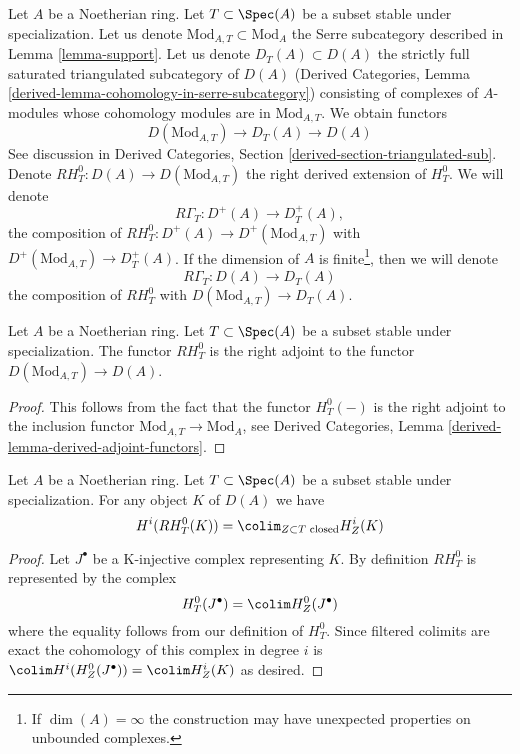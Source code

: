 \noindent
Let $A$ be a Noetherian ring. Let $T \subset \Spec(A)$ be a subset stable
under specialization. Let us denote $\text{Mod}_{A, T} \subset \text{Mod}_A$
the Serre subcategory described in Lemma \ref{lemma-support}.
Let us denote $D_T(A) \subset D(A)$ the
strictly full saturated triangulated subcategory of $D(A)$
(Derived Categories, Lemma \ref{derived-lemma-cohomology-in-serre-subcategory})
consisting of complexes of $A$-modules whose cohomology modules
are in $\text{Mod}_{A, T}$. We obtain functors
$$
D(\text{Mod}_{A, T}) \to D_T(A) \to D(A)
$$
See discussion in
Derived Categories, Section \ref{derived-section-triangulated-sub}.
Denote $RH^0_T : D(A) \to D(\text{Mod}_{A, T})$ the right
derived extension of $H^0_T$. We will denote
$$
R\Gamma_T : D^+(A) \to D^+_T(A),
$$
the composition of $RH^0_T : D^+(A) \to D^+(\text{Mod}_{A, T})$ with
$D^+(\text{Mod}_{A, T}) \to D^+_T(A)$. If the dimension of $A$ is
finite\footnote{If $\dim(A) = \infty$ the construction
may have unexpected properties on unbounded complexes.},
then we will denote
$$
R\Gamma_T : D(A) \to D_T(A)
$$
the composition of $RH^0_T$ with
$D(\text{Mod}_{A, T}) \to D_T(A)$.

\begin{lemma}
\label{lemma-adjoint}
Let $A$ be a Noetherian ring. Let $T \subset \Spec(A)$
be a subset stable under specialization. The functor
$RH^0_T$ is the right adjoint to the functor
$D(\text{Mod}_{A, T}) \to D(A)$.
\end{lemma}

\begin{proof}
This follows from the fact that the functor $H^0_T(-)$ is
the right adjoint to the inclusion functor
$\text{Mod}_{A, T} \to \text{Mod}_A$, see
Derived Categories, Lemma \ref{derived-lemma-derived-adjoint-functors}.
\end{proof}

\begin{lemma}
\label{lemma-adjoint-ext}
Let $A$ be a Noetherian ring. Let $T \subset \Spec(A)$
be a subset stable under specialization.
For any object $K$ of $D(A)$ we have
$$
H^i(RH^0_T(K)) = \colim_{Z \subset T\text{ closed}} H^i_Z(K)
$$
\end{lemma}

\begin{proof}
Let $J^\bullet$ be a K-injective complex representing $K$.
By definition $RH^0_T$ is represented by the complex
$$
H^0_T(J^\bullet) = \colim H^0_Z(J^\bullet)
$$
where the equality follows from our definition of $H^0_T$.
Since filtered colimits are exact the cohomology of this
complex in degree $i$ is
$\colim H^i(H^0_Z(J^\bullet)) = \colim H^i_Z(K)$
as desired.
\end{proof}

